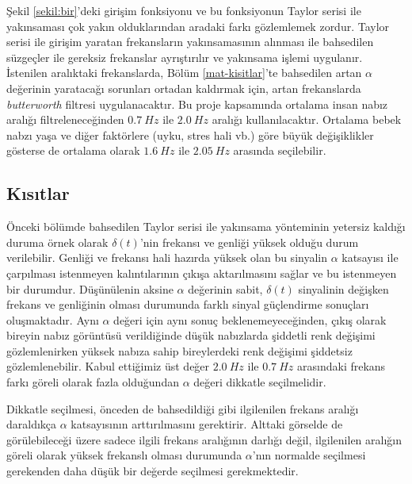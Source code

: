 \documentclass[a4paper, 12pt]{article}
\begin{document}
Şekil \ref{sekil:bir}'deki girişim fonksiyonu ve bu fonksiyonun Taylor serisi ile yakınsaması çok yakın olduklarından aradaki farkı gözlemlemek zordur. Taylor serisi ile girişim yaratan frekansların yakınsamasının alınması ile bahsedilen süzgeçler ile gereksiz frekanslar ayrıştırılır ve yakınsama işlemi uygulanır. İstenilen aralıktaki frekanslarda, Bölüm \ref{mat-kisitlar}'te bahsedilen artan $\alpha$ değerinin yaratacağı sorunları ortadan kaldırmak için, artan frekanslarda \textit{butterworth} filtresi uygulanacaktır. Bu proje kapsamında ortalama insan nabız aralığı filtreleneceğinden $0.7\:Hz$ ile $2.0\:Hz$ aralığı kullanılacaktır. Ortalama bebek nabzı yaşa ve diğer faktörlere (uyku, stres hali vb.) göre büyük değişiklikler gösterse de ortalama olarak $1.6\:Hz$ ile $2.05\:Hz$ arasında seçilebilir.  

\subsection{Kısıtlar}{\label{mat-kisitlar}}

Önceki bölümde bahsedilen Taylor serisi ile yakınsama yönteminin yetersiz kaldığı duruma örnek olarak $\delta(t)$'nin frekansı ve genliği yüksek olduğu durum verilebilir. Genliği ve frekansı hali hazırda yüksek olan bu sinyalin $\alpha$ katsayısı ile çarpılması istenmeyen kalıntılarının çıkışa aktarılmasını sağlar ve bu istenmeyen bir durumdur. Düşünülenin aksine $\alpha$ değerinin sabit, $\delta(t)$ sinyalinin değişken frekans ve genliğinin olması durumunda farklı sinyal güçlendirme sonuçları oluşmaktadır. Aynı $\alpha$ değeri için aynı sonuç beklenemeyeceğinden, çıkış olarak bireyin nabız görüntüsü verildiğinde düşük nabızlarda şiddetli renk değişimi gözlemlenirken yüksek nabıza sahip bireylerdeki renk değişimi şiddetsiz gözlemlenebilir. Kabul ettiğimiz üst değer $2.0\:Hz$ ile $0.7\:Hz$ arasındaki frekans farkı göreli olarak fazla olduğundan $\alpha$ değeri dikkatle seçilmelidir. 

Dikkatle seçilmesi, önceden de bahsedildiği gibi ilgilenilen frekans aralığı daraldıkça $\alpha$ katsayısının arttırılmasını gerektirir. Alttaki görselde de görülebileceği üzere sadece ilgili frekans aralığının darlığı değil, ilgilenilen aralığın göreli olarak yüksek frekanslı olması durumunda $\alpha$'nın normalde seçilmesi gerekenden daha düşük bir değerde seçilmesi gerekmektedir.
\end{document}
